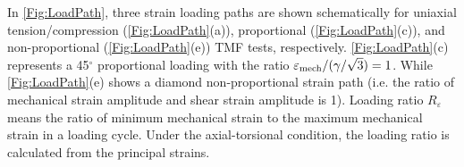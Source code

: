 In \ref{Fig:LoadPath}, three strain loading paths are shown schematically for uniaxial tension/compression (\ref{Fig:LoadPath}(a)), proportional (\ref{Fig:LoadPath}(c)), and non-proportional (\ref{Fig:LoadPath}(e)) TMF tests, respectively. \ref{Fig:LoadPath}(c) represents a 45$^\circ$ proportional loading with the ratio $\varepsilon_{\rm mech}/(\gamma/\sqrt{3})=1$. While \ref{Fig:LoadPath}(e) shows a diamond non-proportional strain path (i.e. the ratio of mechanical strain amplitude and shear strain amplitude is 1). Loading ratio $R_\varepsilon$ means the ratio of minimum mechanical strain to the maximum mechanical strain in a loading cycle. Under the axial-torsional condition, the loading ratio is calculated from the principal strains.



